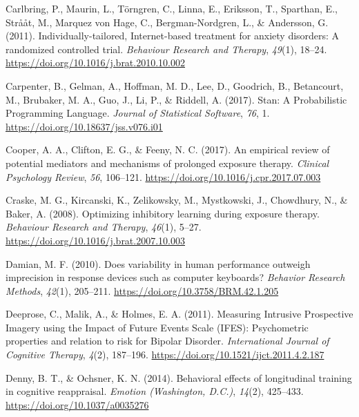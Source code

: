 \documentclass[
  man,floatsintext]{apa7}
\newlength{\cslhangindent}
\newlength{\cslentryspacingunit} %
\newenvironment{CSLReferences}[2] %
 {%
  \setlength{\parindent}{0pt}
  \ifodd #1
  \let\oldpar\par
  \def\par{\hangindent=\cslhangindent\oldpar}
  \fi
  \setlength{\parskip}{#2\cslentryspacingunit}
 }%
 {}
\begin{document}
\begin{CSLReferences}{1}{0}
\leavevmode{}%
Carlbring, P., Maurin, L., Törngren, C., Linna, E., Eriksson, T., Sparthan, E., Strååt, M., Marquez von Hage, C., Bergman-Nordgren, L., \& Andersson, G. (2011). Individually-tailored, Internet-based treatment for anxiety disorders: A randomized controlled trial. \emph{Behaviour Research and Therapy}, \emph{49}(1), 18--24. \url{https://doi.org/10.1016/j.brat.2010.10.002}

\leavevmode{}%
Carpenter, B., Gelman, A., Hoffman, M. D., Lee, D., Goodrich, B., Betancourt, M., Brubaker, M. A., Guo, J., Li, P., \& Riddell, A. (2017). Stan: A Probabilistic Programming Language. \emph{Journal of Statistical Software}, \emph{76}, 1. \url{https://doi.org/10.18637/jss.v076.i01}

\leavevmode{}%
Cooper, A. A., Clifton, E. G., \& Feeny, N. C. (2017). An empirical review of potential mediators and mechanisms of prolonged exposure therapy. \emph{Clinical Psychology Review}, \emph{56}, 106--121. \url{https://doi.org/10.1016/j.cpr.2017.07.003}

\leavevmode{}%
Craske, M. G., Kircanski, K., Zelikowsky, M., Mystkowski, J., Chowdhury, N., \& Baker, A. (2008). Optimizing inhibitory learning during exposure therapy. \emph{Behaviour Research and Therapy}, \emph{46}(1), 5--27. \url{https://doi.org/10.1016/j.brat.2007.10.003}

\leavevmode{}%
Damian, M. F. (2010). Does variability in human performance outweigh imprecision in response devices such as computer keyboards? \emph{Behavior Research Methods}, \emph{42}(1), 205--211. \url{https://doi.org/10.3758/BRM.42.1.205}

\leavevmode{}%
Deeprose, C., Malik, A., \& Holmes, E. A. (2011). Measuring Intrusive Prospective Imagery using the Impact of Future Events Scale (IFES): Psychometric properties and relation to risk for Bipolar Disorder. \emph{International Journal of Cognitive Therapy}, \emph{4}(2), 187--196. \url{https://doi.org/10.1521/ijct.2011.4.2.187}

\leavevmode{}%
Denny, B. T., \& Ochsner, K. N. (2014). Behavioral effects of longitudinal training in cognitive reappraisal. \emph{Emotion (Washington, D.C.)}, \emph{14}(2), 425--433. \url{https://doi.org/10.1037/a0035276}


\end{CSLReferences}
\end{document}
